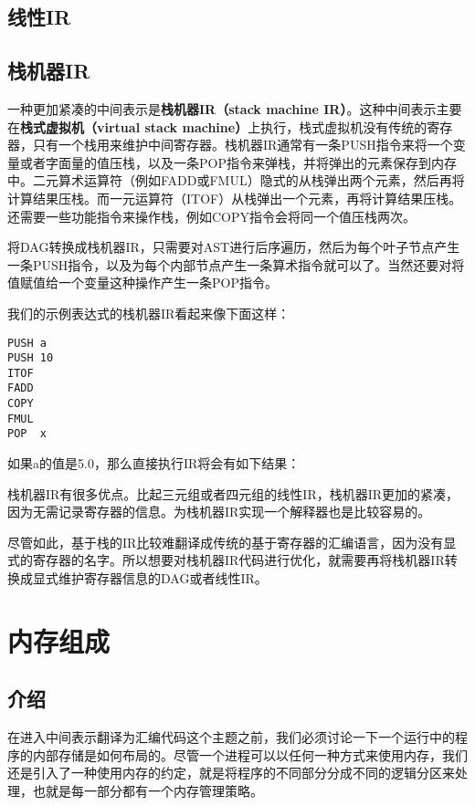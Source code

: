 \documentclass[cn,11pt,chinese]{elegantbook}
\begin{document}
\section{线性IR}

\section{栈机器IR}

一种更加紧凑的中间表示是\textbf{栈机器IR（stack machine IR）}。这种中间表示主要在\textbf{栈式虚拟机（virtual stack machine）}上执行，栈式虚拟机没有传统的寄存器，只有一个栈用来维护中间寄存器。栈机器IR通常有一条PUSH指令来将一个变量或者字面量的值压栈，以及一条POP指令来弹栈，并将弹出的元素保存到内存中。二元算术运算符（例如FADD或FMUL）隐式的从栈弹出两个元素，然后再将计算结果压栈。而一元运算符（ITOF）从栈弹出一个元素，再将计算结果压栈。还需要一些功能指令来操作栈，例如COPY指令会将同一个值压栈两次。

将DAG转换成栈机器IR，只需要对AST进行后序遍历，然后为每个叶子节点产生一条PUSH指令，以及为每个内部节点产生一条算术指令就可以了。当然还要对将值赋值给一个变量这种操作产生一条POP指令。

我们的示例表达式的栈机器IR看起来像下面这样：

\begin{verbatim}
PUSH a
PUSH 10
ITOF
FADD
COPY
FMUL
POP  x
\end{verbatim}

如果a的值是5.0，那么直接执行IR将会有如下结果：

栈机器IR有很多优点。比起三元组或者四元组的线性IR，栈机器IR更加的紧凑，因为无需记录寄存器的信息。为栈机器IR实现一个解释器也是比较容易的。

尽管如此，基于栈的IR比较难翻译成传统的基于寄存器的汇编语言，因为没有显式的寄存器的名字。所以想要对栈机器IR代码进行优化，就需要再将栈机器IR转换成显式维护寄存器信息的DAG或者线性IR。

\chapter{内存组成}

\section{介绍}

在进入中间表示翻译为汇编代码这个主题之前，我们必须讨论一下一个运行中的程序的内部存储是如何布局的。尽管一个进程可以以任何一种方式来使用内存，我们还是引入了一种使用内存的约定，就是将程序的不同部分分成不同的逻辑分区来处理，也就是每一部分都有一个内存管理策略。
\end{document}
